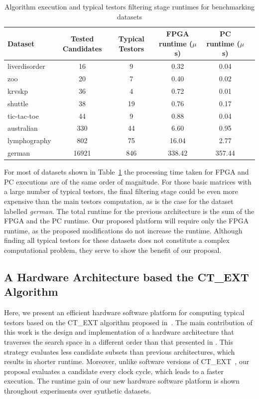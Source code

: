 \documentclass[authoryear,11pt]{elsarticle}
\begin{document}
	\begin{table}[htb]
	\caption{Algorithm execution and typical testors filtering stage runtimes for benchmarking datasets}
	\label{tabTimes}
	\centering
	\begin{tabular}{lccccc}
	 	\hline                       
	  	Dataset & Tested Candidates & Typical Testors & FPGA runtime ($ \mu $s) & PC runtime ($ \mu $s)\\
	  	\hline
	  	liverdisorder& 16   & 9    & 0.32  & 0.04 \\
	  	zoo          & 20   & 7    & 0.40  & 0.02 \\
	  	krvskp       & 36   & 4    & 0.72  & 0.01 \\	  	
	  	shuttle      & 38   & 19   & 0.76  & 0.17 \\
	  	tic-tac-toe  & 44   & 9    & 0.88  & 0.04 \\
	  	australian   & 330  & 44   & 6.60  & 0.95 \\
	  	lymphography & 802  & 75   & 16.04 & 2.77 \\
	  	german       & 16921& 846  & 338.42& 357.44 \\
	 	\hline 
	\end{tabular}
	\end{table}
	
	For most of datasets shown in Table~\ref{tabTimes} the processing time taken for FPGA and PC executions are 
	of the same order of magnitude. For those basic matrices with a large number of typical testors, the final 
	filtering stage could be  even more expensive than the main testors computation, as is the case for the dataset 
	labelled \textit{german}. The total runtime for the previous architecture is the sum of the FPGA and the 
	PC runtime. Our proposed platform will require only the FPGA runtime, as the proposed modifications do not 
	increase the runtime. Although finding all typical testors for these datasets does not constitute a complex 
	computational problem, they serve to show the benefit of our proposal.

\subsection{A Hardware Architecture based the CT\_EXT Algorithm}\label{CTH}
	Here, we present an efficient hardware software platform for computing typical
	testors based on the CT\_EXT algorithm proposed in~\citep{Sanchez07}. The main contribution of this
	work is the design and implementation of a hardware architecture that traverses the search space in a 
	different order than that presented in \citep{Rojas07, Rojas12,Rodriguez14}. This strategy evaluates less
	candidate subsets than previous architectures, which results in shorter runtime. Moreover, unlike 
	software versions of CT\_EXT~\citep{Sanchez07, Sanchez10}, our proposal evaluates a candidate every clock 
	cycle, which leads to a faster execution. The runtime gain of our new hardware software platform is
	shown throughout	experiments over synthetic datasets.
	
\end{document}
